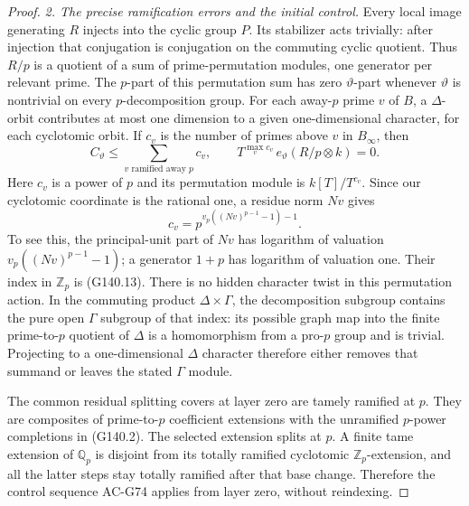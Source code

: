\begin{proof}
\emph{2. The precise ramification errors and the initial control.}
Every local image generating $R$ injects into the cyclic group $P$.
Its stabilizer acts trivially: after injection that conjugation is
conjugation on the commuting cyclic quotient.  Thus $R/p$ is a
quotient of a sum of prime-permutation modules, one generator per
relevant prime.  The $p$-part of this permutation sum has zero
$\vartheta$-part whenever $\vartheta$ is nontrivial on every
$p$-decomposition group.  For each away-$p$ prime $v$ of $B$, a
$\Delta$-orbit contributes at most one dimension to a given
one-dimensional character, for each cyclotomic orbit.
If $c_v$ is the number of primes above $v$ in $B_\infty$, then
\[
 C_\vartheta\le\sum_{v\text{ ramified away }p}c_v,
 \qquad T^{\max_v c_v}\,e_\vartheta(R/p\otimes k)=0.
 \tag{G140.12}
\]
Here $c_v$ is a power of $p$ and its permutation module is
$k[T]/T^{c_v}$.  Since our cyclotomic coordinate is the rational
one, a residue norm $Nv$ gives
\[
       c_v=p^{v_p((Nv)^{p-1}-1)-1}.
 \tag{G140.13}
\]
To see this, the principal-unit part of $Nv$ has logarithm of
valuation $v_p((Nv)^{p-1}-1)$; a generator $1+p$ has logarithm
of valuation one.  Their index in $\mathbb Z_p$ is (G140.13).
There is no hidden character twist in this permutation action.
In the commuting product $\Delta\times\Gamma$, the decomposition
subgroup contains the pure open $\Gamma$ subgroup of that index:
its possible graph map into the finite prime-to-$p$ quotient of
$\Delta$ is a homomorphism from a pro-$p$ group and is trivial.
Projecting to a one-dimensional $\Delta$ character therefore
either removes that summand or leaves the stated $\Gamma$ module.

The common residual splitting covers at layer zero are tamely
ramified at $p$.  They are composites of prime-to-$p$ coefficient
extensions with the unramified $p$-power completions in (G140.2).
The selected extension splits at $p$.  A finite tame extension
of $\mathbb Q_p$ is disjoint from its totally ramified cyclotomic
$\mathbb Z_p$-extension, and all the latter steps stay totally
ramified after that base change.  Therefore the control sequence
AC-G74 applies from layer zero, without reindexing.


\end{proof}
